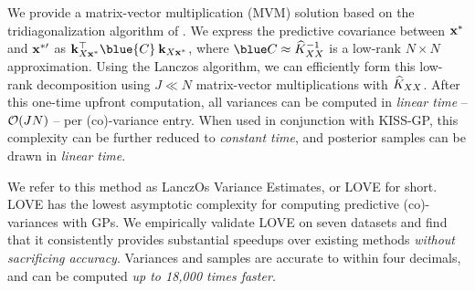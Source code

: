 We provide a matrix-vector multiplication (MVM) solution based on the tridiagonalization algorithm of \citet{lanczos1950iteration}.
We express the predictive covariance between $\mathbf{x}^*$ and $\mathbf{x}^{*\prime}$ as
$\bk_{\bX\bxtest}^\top {\blue{\bC}} \: \bk_{\bX\bxtest}$,
where $\blue \bC \approx \trainK^{-1}$ is a low-rank $N \times N$ approximation.
Using the Lanczos algorithm, we can efficiently form this low-rank decomposition using $J \ll N$ matrix-vector multiplications with $\widehat{K}_{XX}$.
After this one-time upfront computation, all variances can be computed in \emph{linear time} -- $\bigo{JN}$ -- per (co)-variance entry.
When used in conjunction with KISS-GP, this complexity can be further reduced to \emph{constant time}, and posterior samples can be drawn in \emph{linear time}.

We refer to this method as LanczOs Variance Estimates, or LOVE{} for short.
LOVE{} has the lowest asymptotic complexity for computing predictive (co)-variances with GPs.
We empirically validate LOVE{} on seven datasets and find that it consistently provides substantial speedups over existing methods \emph{without sacrificing accuracy}.
Variances and samples are accurate to within four decimals, and can be computed \emph{up to 18,000 times faster.}
